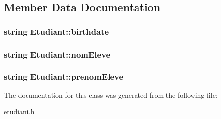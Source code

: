 \subsection{Member Data Documentation}
\hypertarget{class_etudiant_a23b0bd1afd7b7fb4f600e78d7ce4ebc7}{
\subsubsection[{birthdate}]{\setlength{\rightskip}{0pt plus 5cm}string Etudiant\+::birthdate\hspace{0.3cm}{\ttfamily [private]}}}\label{class_etudiant_a23b0bd1afd7b7fb4f600e78d7ce4ebc7}
\hypertarget{class_etudiant_a78c92cfe77639d58fe3d6597e4737d79}{
\subsubsection[{nom\+Eleve}]{\setlength{\rightskip}{0pt plus 5cm}string Etudiant\+::nom\+Eleve\hspace{0.3cm}{\ttfamily [private]}}}\label{class_etudiant_a78c92cfe77639d58fe3d6597e4737d79}
\hypertarget{class_etudiant_a484469a096eaddc8f432003b00ca2f54}{
\subsubsection[{prenom\+Eleve}]{\setlength{\rightskip}{0pt plus 5cm}string Etudiant\+::prenom\+Eleve\hspace{0.3cm}{\ttfamily [private]}}}\label{class_etudiant_a484469a096eaddc8f432003b00ca2f54}


The documentation for this class was generated from the following file\+:\begin{DoxyCompactItemize}
\item 
\hyperlink{etudiant_8h}{etudiant.\+h}\end{DoxyCompactItemize}
